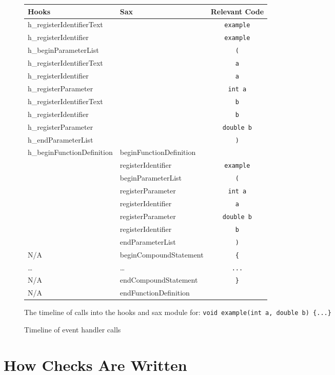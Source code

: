 \documentclass[12pt]{report}
\begin{document}
\begin{figure}
\caption{Timeline of event handler calls}
\label{handlerTimeline}
\begin{center}
\begin{tabular}{llc}
\toprule
Hooks & Sax  & Relevant Code\\
\midrule
h\_registerIdentifierText & & \lstinline!example! \\
h\_registerIdentifier & & \lstinline!example! \\
h\_beginParameterList & & \lstinline!(! \\
h\_registerIdentifierText & & \lstinline!a! \\
h\_registerIdentifier & & \lstinline!a! \\
h\_registerParameter & & \lstinline!int a! \\
h\_registerIdentifierText & & \lstinline!b! \\
h\_registerIdentifier & & \lstinline!b! \\
h\_registerParameter & & \lstinline!double b! \\
h\_endParameterList & & \lstinline!)! \\
h\_beginFunctionDefinition & beginFunctionDefinition & \\
 & registerIdentifier & \lstinline!example! \\
 & beginParameterList & \lstinline!(! \\
 & registerParameter & \lstinline!int a! \\
 & registerIdentifier & \lstinline!a! \\
 & registerParameter & \lstinline!double b!\\
 & registerIdentifier & \lstinline!b!\\
 & endParameterList & \lstinline!)!\\
N/A & beginCompoundStatement & \lstinline!{!\\
\ldots & \ldots & \lstinline!...! \\
N/A & endCompoundStatement & \lstinline!}!\\
N/A & endFunctionDefinition \\
 \bottomrule
\end{tabular}
\end{center}
\small{The timeline of calls into the hooks and sax module for:
 \lstinline!void example(int a, double b) {...}!
}
\end{figure}
\newpage

\section{How Checks Are Written}
\label{howChecksAreWritten}
\end{document}
